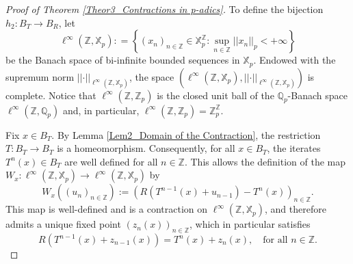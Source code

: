 \documentclass[10pt,a4paper]{amsart}
\begin{document}
\begin{proof}[Proof of Theorem \ref{Theor3_Contractions in p-adics}]
		To define the bijection $h_{2} : B_{T} \to B_{R} $, let 
		$$  \ell^{ \infty } \left(  \mathbb{Z} , \mathbb{X}_{p}  \right)  : =    \left\{   \left(  x_{n}   \right)_{n \in \mathbb{Z} } \in \mathbb{X}_{p}^{\mathbb{Z} } :   \sup_{n \in \mathbb{Z} }  \left| \left|  x_{n}  \right|  \right|_{p}   <   + \infty   \right\}  $$
		be the Banach space of bi-infinite bounded sequences in $\mathbb{X}_{p}$. 
		Endowed with the supremum norm $ \left| \left|  \cdot  \right|  \right|_{\ell^{ \infty } \left(  \mathbb{Z} , \mathbb{X}_{p}  \right) }$, the space $ \left(  \ell^{ \infty } \left(  \mathbb{Z} , \mathbb{X}_{p}  \right) ,  \left| \left|  \cdot  \right|  \right|_{\ell^{ \infty } \left(  \mathbb{Z} , \mathbb{X}_{p}  \right) }  \right) $ is complete. Notice that $\ell^{ \infty } \left(  \mathbb{Z} , \mathbb{Z}_{p}  \right) $ is the closed unit ball of the $\mathbb{Q}_{p}$-Banach space $\ell^{ \infty } \left(  \mathbb{Z} , \mathbb{Q}_{p}  \right) $ and, in particular, $\ell^{ \infty } \left(  \mathbb{Z} , \mathbb{Z}_{p}  \right)  = \mathbb{Z}_{p}^{\mathbb{Z} }$. 
		
		Fix $x \in B_{T}$. By Lemma \ref{Lem2_Domain of the Contraction}, the restriction $T: B_{T} \to B_{T}$ is a homeomorphism. Consequently, for all $x \in B_{T}$, the iterates $T^{n} \left(  x  \right)  \in B_{T}$ are well defined for all $n \in \mathbb{Z} $. This allows the definition of the map $W_{x}: \ell^{ \infty } \left(  \mathbb{Z} , \mathbb{X}_{p}  \right)  \to \ell^{ \infty } \left(  \mathbb{Z} , \mathbb{X}_{p}  \right) $ by  
		\begin{equation}\label{Eq3_Fixed Point Operator}
			W_{x} \left(   \left(  u_{n}   \right)_{n \in \mathbb{Z} }  \right)  :=    \left(  R \left(  T^{n-1}(x) + u_{n-1}   \right)  -  T^{n}(x)      \right)_{n \in \mathbb{Z} } .
		\end{equation} 
		This map is well-defined and is a contraction on $\ell^{ \infty } \left(  \mathbb{Z} , \mathbb{X}_{p}  \right) $, and therefore admits a unique fixed point $ \left(  z_{n} \left(  x  \right)    \right)_{n \in \mathbb{Z} }$, which in particular satisfies 
		\begin{equation}\label{Eq3_Fixed Point Recursive Relation} 
			R \left(  T^{n-1} \left(  x  \right)  + z_{n-1} \left(  x  \right)   \right)    =   T^{n} \left(  x  \right)  + z_{n} \left(  x  \right)  , \quad \text{for all } n \in \mathbb{Z} .
		\end{equation}
		
		
		

\end{proof}
\end{document}
